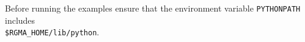 Before running the examples ensure that the environment variable
\texttt{PYTHONPATH} includes\\ \texttt{\$RGMA\_HOME/lib/python}.
